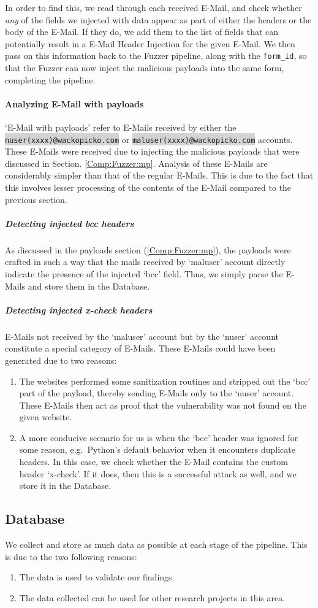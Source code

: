 	In order to find this, we read through each received E-Mail, and check whether \emph{any} of the fields we injected with data appear as part of either the headers or the body of the E-Mail. If they do, we add them to the list of fields that can potentially result in a E-Mail Header Injection for the given E-Mail. We then pass on this information back to the Fuzzer pipeline, along with the \lstinline{form_id}, so that the Fuzzer can now inject the malicious payloads into the same form, completing the pipeline.
	
	\paragraph{Analyzing E-Mail with payloads}
	`E-Mail with payloads' refer to E-Mails received by either the \colorbox{lightgray}{\lstinline{nuser(xxxx)@wackopicko.com}} or \colorbox{lightgray}{\lstinline{maluser(xxxx)@wackopicko.com}} accounts. These E-Mails were received due to injecting the malicious payloads that were discussed in Section. \ref{Comp:Fuzzer:mp}. Analysis of these E-Mails are considerably simpler than that of the regular E-Mails. This is due to the fact that this involves lesser processing of the contents of the E-Mail compared to the previous section.
		\subparagraph{Detecting injected bcc headers}
		As discussed in the payloads section (\ref{Comp:Fuzzer:mp}), the payloads were crafted in such a way that the mails received by `maluser' account directly indicate the presence of the injected `bcc' field. Thus, we simply parse the E-Mails and store them in the Database.
		
		\subparagraph{Detecting injected x-check headers}
		E-Mails not received by the `maluser' account but by the `nuser' account constitute a special category of E-Mails.
		These E-Mails could have been generated due to two reasons:
		\begin{enumerate}
			\item The websites performed some sanitization routines and stripped out the `bcc' part of the payload, thereby sending E-Mails only to the `nuser' account. These E-Mails then act as proof that the vulnerability was not found on the given website.
			\item A more conducive scenario for us is when the `bcc' header was ignored for some reason, e.g.\ Python's default behavior when it encounters duplicate headers. In this case, we check whether the E-Mail contains the custom header `x-check'. If it does, then this is a successful attack as well, and we store it in the Database.
		\end{enumerate}
\subsection{Database}
	We collect and store as much data as possible at each stage of the pipeline. This is due to the two following reasons:
	\begin{enumerate}
		\item The data is used to validate our findings.
		\item The data collected can be used for other research projects in this area.
	\end{enumerate}
	
